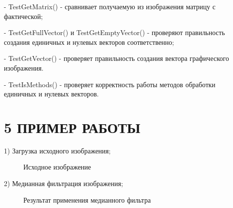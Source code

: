 \documentclass[14pt,a4paper]{extreport}
\begin{document}
\hspace {4ex} - TestGetMatrix() - сравнивает получаемую из изображения матрицу с фактической;\
 
\hspace {4ex} - TestGetFullVector() и TestGetEmptyVector() - проверяют правильность создания единичных и нулевых векторов соответственно;\

\hspace {4ex} - TestGetVector() - проверяет правильность создания вектора графического изображения.\

\hspace {4ex} - TestIsMethods() - проверяет корректность работы методов обработки единичных и нулевых векторов.\

	\newpage
           \section*{\normalsize\hspace{4ex}5 ПРИМЕР РАБОТЫ}

\hspace {4ex} 1)	Загрузка исходного изображения;

 \begin{figure}[h!]
\caption{Исходное изображение}
\end{figure}

\hspace {4ex} 2)	Медианная фильтрация изображения;

 \begin{figure}[h!]
\caption{Результат применения медианного фильтра}
\end{figure}
\end{document}
